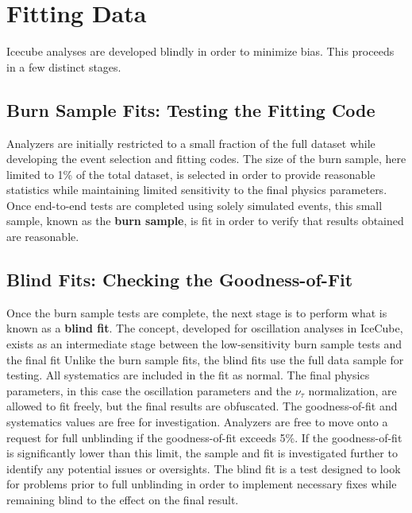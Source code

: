 \label{sec:fitting_data}
\section{Fitting Data}
Icecube analyses are developed blindly in order to minimize bias.
This proceeds in a few distinct stages.

\label{subsec:burn_sample}
\subsection{Burn Sample Fits: Testing the Fitting Code}
Analyzers are initially restricted to a small fraction of the full dataset while developing the event selection and fitting codes.
The size of the burn sample, here limited to 1\% of the total dataset, is selected in order to provide reasonable statistics while maintaining limited sensitivity to the final physics parameters.
Once end-to-end tests are completed using solely simulated events, this small sample, known as the \textbf{burn sample}, is fit in order to verify that results obtained are reasonable.



\label{subsec:blind_fits}
\subsection{Blind Fits: Checking the Goodness-of-Fit}
Once the burn sample tests are complete, the next stage is to perform what is known as a \textbf{blind fit}.
The concept, developed for oscillation analyses in IceCube, exists as an intermediate stage between the low-sensitivity burn sample tests and the final fit 
Unlike the burn sample fits, the blind fits use the full data sample for testing.
All systematics are included in the fit as normal.
The final physics parameters, in this case the oscillation parameters and the $\nu_\tau$ normalization, are allowed to fit freely, but the final results are obfuscated.
The goodness-of-fit and systematics values are free for investigation.
Analyzers are free to move onto a request for full unblinding if the goodness-of-fit exceeds 5\%.
If the goodness-of-fit is significantly lower than this limit, the sample and fit is investigated further to identify any potential issues or oversights.
The blind fit is a test designed to look for problems prior to full unblinding in order to implement necessary fixes while remaining blind to the effect on the final result.

